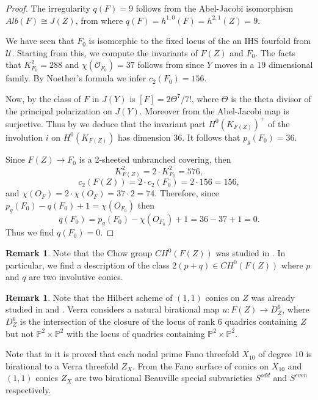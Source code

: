\documentclass[a4paper,11pt]{amsart}
\theoremstyle{definition}
\newtheorem{rem}[thm]{Remark}
\numberwithin{equation}{section}
\numberwithin{equation}{section} \theoremstyle{definition}
\begin{document}
{\medskip 

\begin{proof}

 
The irregularity $q(F) = 9$ follows from the Abel-Jacobi isomorphism
$Alb(F) \cong J(Z)$, from where $q(F) = h^{1,0}(F) = h^{2,1}(Z) = 9$. 

We have seen that $F_0 $ is isomorphic to the fixed locus of the 
an IHS fourfold from $\mathcal{U}$. Starting from this, we compute 
the invariants of $F(Z)$ and $F_0$. 
The facts that  $K^2_{F_0} = 288$ and $\chi({\mathcal O}_{F_0})= 37$ follows from \cite{beau-invo} since $Y$ moves in a $19$ dimensional family. 
By Noether's formula we infer $c_2(F_0)=156$.

Now, by \cite{Beauville3} the class of $F$ in $J(Y)$
is $[F] = 2\Theta^7/7!$, where $\Theta$ is the theta divisor
of the principal polarization on $J(Y) $. Moreover from \cite[Corollary~3.17]{Vo1} the Abel-Jacobi map is surjective. Thus by \cite[Corollary~3.18]{Vo1} we deduce that the invariant part $H^0(K_{F(Z)})^+$ of the involution $i$ on $H^0(K_{F(Z)})$ has dimension $36$.
It follows that $p_g(F_0)=36$.

Since $F(Z) \rightarrow F_0$ is a 2-sheeted unbranched covering, then
$$
K^2_{F(Z)} =2 \cdot K^2_{F_0} = 576, $$
$$
c_2(F(Z)) = 2 \cdot c_2(F_0) = 2\cdot 156= 156,
$$
and $\chi(O_{F}) = 2\cdot \chi(O_F) = 37\cdot2 = 74$.  
Therefore, since $p_g(F_0) - q(F_0) + 1 =  \chi(O_{F_0})$ then 
$$
q(F_0) = p_g(F_0) - \chi(O_{F_0}) + 1 = 36- 37+ 1 = 0.
$$ 
Thus we find $q(F_0)=0$.
\end{proof}
\begin{rem} Note that the Chow group $CH^0(F(Z))$ was studied in \cite[Proposition~1.1]{Vo1}.
In particular, we find a description of the class $2(p+q)\in CH^0(F(Z))$ where $p$ and $q$ are two involutive conics.
\end{rem}
\begin{rem} Note that the Hilbert scheme of $(1,1)$ conics on $Z$ was already studied in \cite[\S 6]{Vera} and \cite{DIM}.
Verra considers a natural birational map $u\colon F(Z)\to D_Z^6$, where $D_Z^6$ is the intersection of the closure of the locus of rank $6$ quadrics containing $Z$ but not ${{\mathbb{P}}}^2\times {{\mathbb{P}}}^2$ with the locus of quadrics containing ${{\mathbb{P}}}^2\times {{\mathbb{P}}}^2$. 

Note that in \cite{DIM} it is proved that each nodal  prime Fano threefold $X_{10}$ of degree $10$ is birational to a Verra threefold $Z_X$.
From \cite[Proposition~6.6., \S 5.4]{DIM} the Fano surface of conics on $X_{10}$ and $(1,1)$ conics $Z_X$ are two birational  Beauville special subvarieties $S^{odd}$ and $S^{even}$ respectively.


\end{rem}}
\end{document}
